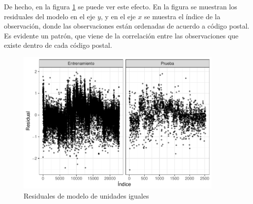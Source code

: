 De hecho, en la figura \ref{fig:comp_pooling_resids} se puede ver este efecto. En la figura se muestran los residuales del modelo en el eje $y$, y en el eje $x$ se muestra el índice de la observación, donde las observaciones están ordenadas de acuerdo a código postal. Es evidente un patrón, que viene de la correlación entre las observaciones que existe dentro de cada código postal.

\begin{figure}[h]
    \centering
    \includegraphics[width=0.9\textwidth]{images/comp_pooling_resids.pdf}
    \caption{Residuales de modelo de unidades iguales}
    \label{fig:comp_pooling_resids}
\end{figure}

